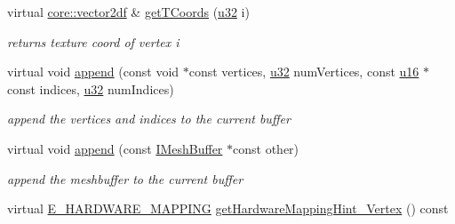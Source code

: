\begin{DoxyCompactItemize}
\mbox{\label{structirr_1_1scene_1_1SSharedMeshBuffer_afbddb6a0849cee729659d34dedd11fca}} 
virtual \hyperlink{namespaceirr_1_1core_a116f90bd31515724b6235014ee2b74d5}{core\+::vector2df} \& \hyperlink{structirr_1_1scene_1_1SSharedMeshBuffer_afbddb6a0849cee729659d34dedd11fca}{get\+T\+Coords} (\hyperlink{namespaceirr_a0416a53257075833e7002efd0a18e804}{u32} i)
\begin{DoxyCompactList}\small\item\em returns texture coord of vertex i \end{DoxyCompactList}\item 
\mbox{\label{structirr_1_1scene_1_1SSharedMeshBuffer_af7faf5e2b8245c4be3efb6e766281579}} 
virtual void \hyperlink{structirr_1_1scene_1_1SSharedMeshBuffer_af7faf5e2b8245c4be3efb6e766281579}{append} (const void $\ast$const vertices, \hyperlink{namespaceirr_a0416a53257075833e7002efd0a18e804}{u32} num\+Vertices, const \hyperlink{namespaceirr_ae9f8ec82692ad3b83c21f555bfa70bcc}{u16} $\ast$const indices, \hyperlink{namespaceirr_a0416a53257075833e7002efd0a18e804}{u32} num\+Indices)
\begin{DoxyCompactList}\small\item\em append the vertices and indices to the current buffer \end{DoxyCompactList}\item 
\mbox{\label{structirr_1_1scene_1_1SSharedMeshBuffer_aa4fbcc497cfd0b431bb85d607ed6a2fb}} 
virtual void \hyperlink{structirr_1_1scene_1_1SSharedMeshBuffer_aa4fbcc497cfd0b431bb85d607ed6a2fb}{append} (const \hyperlink{classirr_1_1scene_1_1IMeshBuffer}{I\+Mesh\+Buffer} $\ast$const other)
\begin{DoxyCompactList}\small\item\em append the meshbuffer to the current buffer \end{DoxyCompactList}\item 
\mbox{\label{structirr_1_1scene_1_1SSharedMeshBuffer_a366bdea5fedc452e8ffec4cf14f0e7b4}} 
virtual \hyperlink{namespaceirr_1_1scene_ac7d8ee8d77da75f2580bb9bb17231c27}{E\+\_\+\+H\+A\+R\+D\+W\+A\+R\+E\+\_\+\+M\+A\+P\+P\+I\+NG} \hyperlink{structirr_1_1scene_1_1SSharedMeshBuffer_a366bdea5fedc452e8ffec4cf14f0e7b4}{get\+Hardware\+Mapping\+Hint\+\_\+\+Vertex} () const

\end{DoxyCompactItemize}
